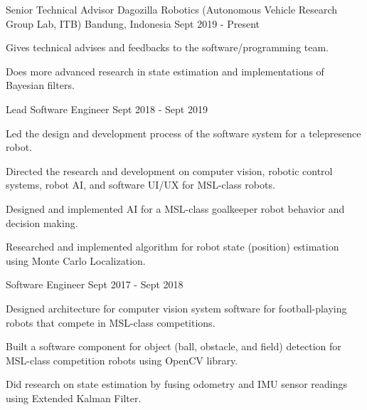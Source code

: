 

\begin{cventries}

    \cventry
    {Senior Technical Advisor} %
    {Dagozilla Robotics (Autonomous Vehicle Research Group Lab, ITB)} %
    {Bandung, Indonesia} %
    {Sept 2019 - Present} %
    {
        \begin{cvitems} %
            \item {Gives technical advises and feedbacks to the software/programming team.}
            \item {Does more advanced research in state estimation and implementations of Bayesian filters.}
        \end{cvitems}
    }

  \cventry
	{Lead Software Engineer} %
	{} %
	{} %
	{Sept 2018 - Sept 2019} %
	{
	  \begin{cvitems} %
	  	\item {Led the design and development process of the software system for a telepresence robot.}
		\item {Directed the research and development on computer vision, robotic control systems, robot AI, and software UI/UX for MSL-class robots.}
		\item {Designed and implemented AI for a MSL-class goalkeeper robot behavior and decision making.}
		\item {Researched and implemented algorithm for robot state (position) estimation using Monte Carlo Localization.}
	  \end{cvitems}
	}

  \cventry
	{Software Engineer} %
	{} %
	{} %
	{Sept 2017 - Sept 2018} %
	{
	  \begin{cvitems} %
		\item {Designed architecture for computer vision system software for football-playing robots that compete in MSL-class competitions.}
		\item {Built a software component for object (ball, obstacle, and field) detection for MSL-class competition robots using OpenCV library.}
        \item {Did research on state estimation by fusing odometry and IMU sensor readings using Extended Kalman Filter.}
	  \end{cvitems}
	}


\end{cventries}
